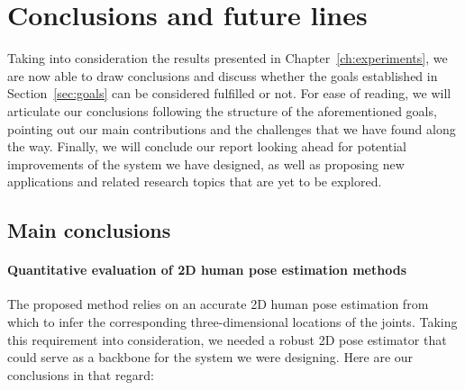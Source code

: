 \chapter{Conclusions and future lines}\label{ch:conclusions}
Taking into consideration the results presented in Chapter~\ref{ch:experiments}, we are now able to draw conclusions and discuss whether the goals established in Section~\ref{sec:goals} can be considered fulfilled or not. For ease of reading, we will articulate our conclusions following the structure of the aforementioned goals, pointing out our main contributions and the challenges that we have found along the way. Finally, we will conclude our report looking ahead for potential improvements of the system we have designed, as well as proposing new applications and related research topics that are yet to be explored.

\section{Main conclusions}
\subsubsection{Quantitative evaluation of 2D human pose estimation methods}
The proposed method relies on an accurate 2D human pose estimation from which to infer the corresponding three-dimensional locations of the joints. Taking this requirement into consideration, we needed a robust 2D pose estimator that could serve as a backbone for the system we were designing. Here are our conclusions in that regard:

